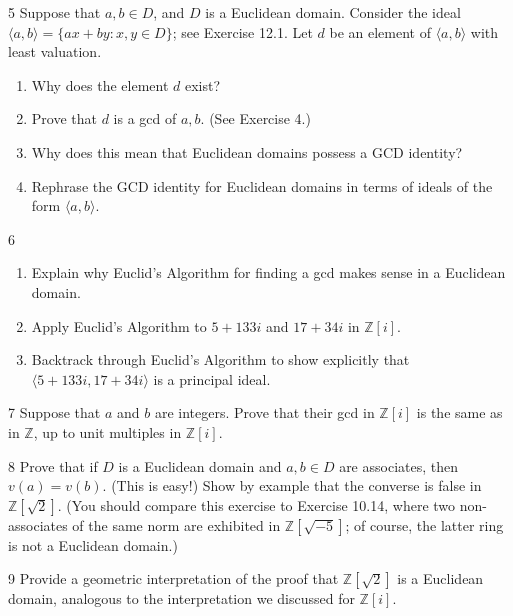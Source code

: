 \begin{problem}{5}
    Suppose that $a, b \in D$, and $D$ is a Euclidean domain. Consider the ideal
    $\langle a, b \rangle = \{ax + by : x, y \in D\}$; see Exercise 12.1. Let $d$ be an
    element of $\langle a, b \rangle$ with least valuation.
    \begin{enumerate}
        \item[(a)] Why does the element $d$ exist?
        \item[(b)] Prove that $d$ is a gcd of $a, b$. (See Exercise 4.)
        \item[(c)] Why does this mean that Euclidean domains possess a GCD identity?
        \item[(d)] Rephrase the GCD identity for Euclidean domains in terms of ideals of
        the form $\langle a, b \rangle$.
    \end{enumerate}
\end{problem}
\unsolved

\begin{problem}{6}
    \begin{enumerate}
        \item[(a)] Explain why Euclid's Algorithm for finding a gcd makes sense in a
        Euclidean domain.
        \item[(b)] Apply Euclid's Algorithm to $5 + 133i$ and $17 + 34i$ in $\mathbb{Z}[i]$.
        \item[(c)] Backtrack through Euclid's Algorithm to show explicitly that
        $\langle 5 + 133i, 17 + 34i \rangle$ is a principal ideal.
    \end{enumerate}
\end{problem}
\unsolved

\begin{problem}{7}
    Suppose that $a$ and $b$ are integers. Prove that their gcd in $\mathbb{Z}[i]$ is the
    same as in $\mathbb{Z}$, up to unit multiples in $\mathbb{Z}[i]$.
\end{problem}
\unsolved

\begin{problem}{8}
    Prove that if $D$ is a Euclidean domain and $a, b \in D$ are associates, then
    $v(a) = v(b)$. (This is easy!) Show by example that the converse is false in
    $\mathbb{Z}[\sqrt{2}]$. (You should compare this exercise to Exercise 10.14, where two
    non-associates of the same norm are exhibited in $\mathbb{Z}[\sqrt{-5}]$; of course,
    the latter ring is not a Euclidean domain.)
\end{problem}
\unsolved

\begin{problem}{9}
    Provide a geometric interpretation of the proof that $\mathbb{Z}[\sqrt{2}]$ is a
    Euclidean domain, analogous to the interpretation we discussed for $\mathbb{Z}[i]$.
\end{problem}
\unsolved
